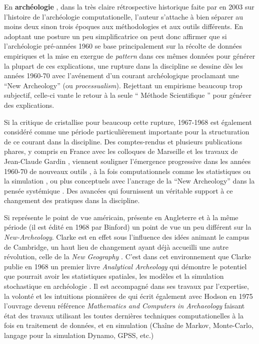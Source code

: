 En \textbf{archéologie} , dans la très claire rétrospective historique faite par \textcite{Lock2003} en 2003 sur l'histoire de l'archéologie computationelle, l'auteur s'attache à bien séparer au moins deux sinon trois époques aux méthodologies et aux outils différents. En adoptant une posture un peu simplificatrice on peut donc affirmer que si l'archéologie pré-années 1960 se base principalement sur la récolte de données empiriques et la mise en exergue de \textit{pattern} dans ces mêmes données pour générer la plupart de ces explications, une rupture dans la discipline se dessine dès les années 1960-70 avec l'avénement d'un courant archéologique proclamant une \foreignquote{english}{New Archeology} (ou \textit{processualism}). Rejettant un empirisme beaucoup trop subjectif, celle-ci vante le retour à la seule \enquote{ Méthode Scientifique } pour générer des explications. 

Si la critique de \textcite{Binford1962} cristallise pour beaucoup cette rupture, 1967-1968 est également considéré comme une période particulièrement importante pour la structuration de ce courant dans la discipline. Des comptes-rendus \autocites{Cowgill1967, Whallon1972} et plusieurs publications phares, y compris en France  avec les colloques de Marseille et les travaux de Jean-Claude Gardin \autocites{Gardin1971, Dallas2015}, viennent souligner l'émergence progressive dans les années 1960-70 de nouveaux outils  , à la fois computationnels comme les statistiques  ou la simulation \autocite{Clarke1968}, ou plus conceptuels avec l'ancrage de la \foreignquote{english}{New Archeology} dans la pensée systémique \autocites{Clarke1968, Flannery1968, Binford1968} . Des avancées qui fournissent un véritable support à ce changement des pratiques dans la discipline.

Si \textcite{Binford1968,Binford1972} représente le point de vue américain, \textcite{Clarke1968} présente en Angleterre et à la même période (il est édité en 1968 par Binford) un point de vue un peu différent sur la \textit{New-Archeology}. Clarke est en effet sous l'influence des idées animant le campus de Cambridge, un haut lieu de changement ayant déjà accueilli une autre révolution, celle de la \textit{New Geography} . C'est dans cet environnement que Clarke publie en 1968 un premier livre \textit{Analytical Archeology} qui démontre le potentiel que pourrait avoir les statistiques spatiales, les modèles et la simulation stochastique en archéologie \autocites{Clarke1968, Clarke1972, Gardin1970}. Il est accompagné dans ses travaux par l'expertise, la volonté et les intuitions pionnières  de \textcite{Doran1970} qui écrit également avec Hodson en 1975 l'ouvrage devenu référence \textit{Mathematics and Computers in Archaeology} \autocite{Doran1975} faisant état des travaux utilisant les toutes dernières techniques computationelles à la fois en traitement de données, et en simulation (Chaîne de Markov, Monte-Carlo, langage pour la simulation Dynamo, GPSS, etc.)

